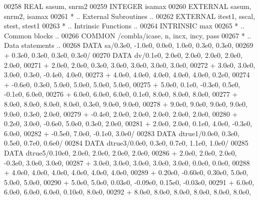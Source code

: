 \begin{DoxyCode}
00258       \textcolor{keywordtype}{REAL}              sasum, snrm2
00259       \textcolor{keywordtype}{INTEGER}           isamax
00260       \textcolor{keywordtype}{EXTERNAL}          sasum, snrm2, isamax
00261 \textcolor{comment}{*     .. External Subroutines ..}
00262       \textcolor{keywordtype}{EXTERNAL}          itest1, sscal, stest, stest1
00263 \textcolor{comment}{*     .. Intrinsic Functions ..}
00264       \textcolor{keywordtype}{INTRINSIC}         max
00265 \textcolor{comment}{*     .. Common blocks ..}
00266       \textcolor{keyword}{COMMON}            /combla/icase, n, incx, incy, pass
00267 \textcolor{comment}{*     .. Data statements ..}
00268       \textcolor{keyword}{DATA}              sa/0.3e0, -1.0e0, 0.0e0, 1.0e0, 0.3e0, 0.3e0,
00269      +                  0.3e0, 0.3e0, 0.3e0, 0.3e0/
00270       \textcolor{keyword}{DATA}              dv/0.1e0, 2.0e0, 2.0e0, 2.0e0, 2.0e0, 2.0e0,
00271      +                  2.0e0, 2.0e0, 0.3e0, 3.0e0, 3.0e0, 3.0e0, 3.0e0,
00272      +                  3.0e0, 3.0e0, 3.0e0, 0.3e0, -0.4e0, 4.0e0,
00273      +                  4.0e0, 4.0e0, 4.0e0, 4.0e0, 4.0e0, 0.2e0,
00274      +                  -0.6e0, 0.3e0, 5.0e0, 5.0e0, 5.0e0, 5.0e0,
00275      +                  5.0e0, 0.1e0, -0.3e0, 0.5e0, -0.1e0, 6.0e0,
00276      +                  6.0e0, 6.0e0, 6.0e0, 0.1e0, 8.0e0, 8.0e0, 8.0e0,
00277      +                  8.0e0, 8.0e0, 8.0e0, 8.0e0, 0.3e0, 9.0e0, 9.0e0,
00278      +                  9.0e0, 9.0e0, 9.0e0, 9.0e0, 9.0e0, 0.3e0, 2.0e0,
00279      +                  -0.4e0, 2.0e0, 2.0e0, 2.0e0, 2.0e0, 2.0e0,
00280      +                  0.2e0, 3.0e0, -0.6e0, 5.0e0, 0.3e0, 2.0e0,
00281      +                  2.0e0, 2.0e0, 0.1e0, 4.0e0, -0.3e0, 6.0e0,
00282      +                  -0.5e0, 7.0e0, -0.1e0, 3.0e0/
00283       \textcolor{keyword}{DATA}              dtrue1/0.0e0, 0.3e0, 0.5e0, 0.7e0, 0.6e0/
00284       \textcolor{keyword}{DATA}              dtrue3/0.0e0, 0.3e0, 0.7e0, 1.1e0, 1.0e0/
00285       \textcolor{keyword}{DATA}              dtrue5/0.10e0, 2.0e0, 2.0e0, 2.0e0, 2.0e0,
00286      +                  2.0e0, 2.0e0, 2.0e0, -0.3e0, 3.0e0, 3.0e0,
00287      +                  3.0e0, 3.0e0, 3.0e0, 3.0e0, 3.0e0, 0.0e0, 0.0e0,
00288      +                  4.0e0, 4.0e0, 4.0e0, 4.0e0, 4.0e0, 4.0e0,
00289      +                  0.20e0, -0.60e0, 0.30e0, 5.0e0, 5.0e0, 5.0e0,
00290      +                  5.0e0, 5.0e0, 0.03e0, -0.09e0, 0.15e0, -0.03e0,
00291      +                  6.0e0, 6.0e0, 6.0e0, 6.0e0, 0.10e0, 8.0e0,
00292      +                  8.0e0, 8.0e0, 8.0e0, 8.0e0, 8.0e0, 8.0e0,

\end{DoxyCode}
